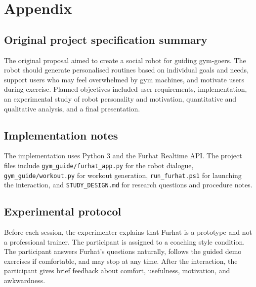 \documentclass[conference, onecolumn]{IEEEtran}
\begin{document}


\section*{Appendix}
\subsection*{Original project specification summary}
The original proposal aimed to create a social robot for guiding gym-goers. The robot should generate personalised routines based on individual goals and needs, support users who may feel overwhelmed by gym machines, and motivate users during exercise. Planned objectives included user requirements, implementation, an experimental study of robot personality and motivation, quantitative and qualitative analysis, and a final presentation.

\subsection*{Implementation notes}
The implementation uses Python 3 and the Furhat Realtime API. The project files include \texttt{gym\_guide/furhat\_app.py} for the robot dialogue, \texttt{gym\_guide/workout.py} for workout generation, \texttt{run\_furhat.ps1} for launching the interaction, and \texttt{STUDY\_DESIGN.md} for research questions and procedure notes.

\subsection*{Experimental protocol}
Before each session, the experimenter explains that Furhat is a prototype and not a professional trainer. The participant is assigned to a coaching style condition. The participant answers Furhat's questions naturally, follows the guided demo exercises if comfortable, and may stop at any time. After the interaction, the participant gives brief feedback about comfort, usefulness, motivation, and awkwardness.
\end{document}
